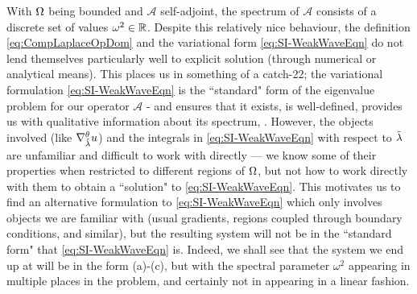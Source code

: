 With $\Omega$ being bounded and $\mathcal{A}$ self-adjoint, the spectrum of $\mathcal{A}$ consists of a discrete set of values $\omega^2\in\mathbb{R}$.
Despite this relatively nice behaviour, the definition \eqref{eq:CompLaplaceOpDom} and the variational form \eqref{eq:SI-WeakWaveEqn} do not lend themselves particularly well to explicit solution (through numerical or analytical means).
This places us in something of a catch-22; the variational formulation \eqref{eq:SI-WeakWaveEqn} is the ``standard" form of the eigenvalue problem for our operator $\mathcal{A}$ - and ensures that it exists, is well-defined, provides us with qualitative information about its spectrum, .
However, the objects involved (like $\nabla^{\theta}_{\tilde{\lambda}}u$) and the integrals in \eqref{eq:SI-WeakWaveEqn} with respect to $\tilde{\lambda}$ are unfamiliar and difficult to work with directly --- we know some of their properties when restricted to different regions of $\Omega$, but not how to work directly with them to obtain a ``solution" to \eqref{eq:SI-WeakWaveEqn}.
This motivates us to find an alternative formulation to \eqref{eq:SI-WeakWaveEqn} which only involves objects we are familiar with (usual gradients, regions coupled through boundary conditions, and similar), but the resulting system will not be in the ``standard form" that \eqref{eq:SI-WeakWaveEqn} is.
Indeed, we shall see that the system we end up at will be in the form (a)-(c), but with the spectral parameter $\omega^2$ appearing in multiple places in the problem, and certainly not in appearing in a linear fashion.

